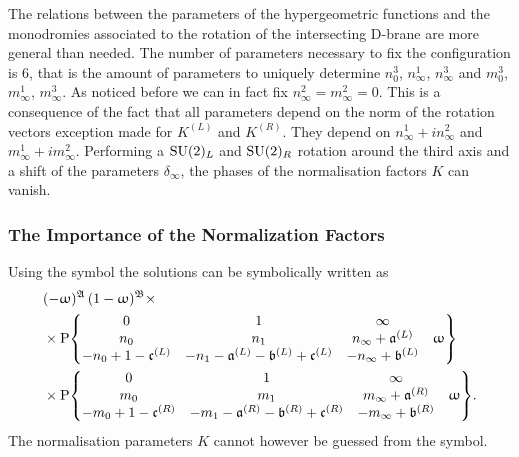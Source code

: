 The relations between the parameters of the hypergeometric functions and the monodromies associated to the rotation of the intersecting D-brane are more general than needed.
The number of parameters necessary to fix the configuration is $6$, that is the amount of parameters to uniquely determine $n_{0}^3$, $n_{\infty}^1$, $n_{\infty}^3$ and $m_{0}^3$, $m_{\infty}^1$, $m_{\infty}^3$.
As noticed before we can in fact fix $n_{\infty}^2 = m_{\infty}^2 = 0$.
This is a consequence of the fact that all parameters depend on the norm of the rotation vectors exception made for $K^{(L)}$ and $K^{(R)}$.
They depend on $n_{\infty}^1 + i n_{\infty}^2$ and $m_{\infty}^1 + i m_{\infty}^2$.
Performing a $\mathrm{SU}(2)_L$ and $\mathrm{SU}(2)_R$ rotation around the third axis and a shift of the parameters $\delta_{\infty}$, the phases of the normalisation factors $K$ can vanish.


\subsubsection{The Importance of the Normalization Factors}

Using the \rP symbol the solutions can be symbolically written as
\begin{equation}
  \begin{split}
    &
    (-\omega)^{\ffA}\, (1-\omega)^{\ffB}
    \times
    \\
    &
    \times
    \rP \qty{
      \mqty{
          0
          &
          1
          &
          \infty
          &
          \\
          n_{0}
          &
          n_{1}
          &
          n_{\infty} + \ffa^{(L)}
          &
          \omega
          \\
          -n_{0} + 1 - \ffc^{(L)}
          &
          -n_{1} - \ffa^{(L)} - \ffb^{(L)} + \ffc^{(L)}
          &
          -n_{\infty} + \ffb^{(L)}
          &
      }
    }
    \\
    &
    \times
    \rP \qty{
      \mqty{
          0
          &
          1
          &
          \infty
          &
          \\
          m_{0}
          &
          m_{1}
          &
          m_{\infty} + \ffa^{(R)}
          &
          \omega
          \\
          -m_{0} + 1 - \ffc^{(R)}
          &
          -m_{1} - \ffa^{(R)} - \ffb^{(R)} + \ffc^{(R)}
          &
          -m_{\infty} + \ffb^{(R)}
          &
      }
      }.
  \end{split}
  \label{eq:symbolic_solutions_using_P}
\end{equation}
The normalisation parameters $K$ cannot however be guessed from the \rP symbol.

